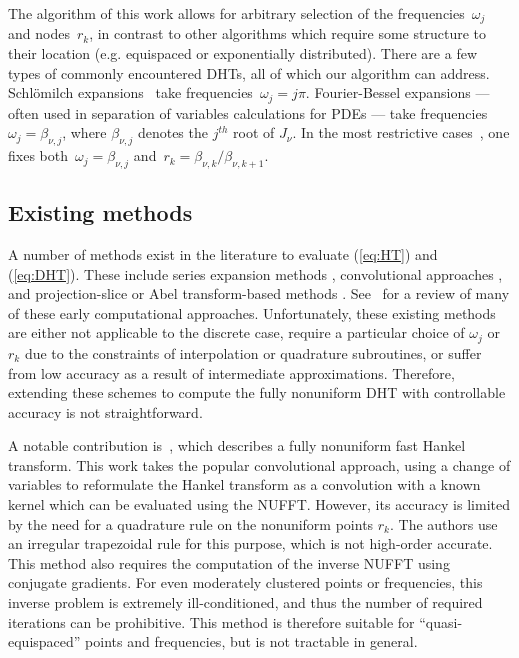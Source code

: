 The algorithm of this work allows for arbitrary selection of the
frequencies~$\omega_j$ and nodes~$r_k$, in contrast to other algorithms which
require some structure to their location (e.g. equispaced or exponentially
distributed). There are a few types of commonly encountered DHTs, all of which
our algorithm can address. Schl\"omilch
expansions~\cite{linton2006schlomilch,townsend2015fast} take
frequencies~$\omega_j = j\pi$. Fourier-Bessel expansions --- often used in
separation of variables calculations for PDEs --- take frequencies~$\omega_j =
\beta_{\nu,j}$, where $\beta_{\nu,j}$ denotes the $j^{th}$ root of $J_\nu$. In
the most restrictive cases~\cite{johnson1987improved}, one fixes both~$\omega_j
= \beta_{\nu,j}$ and~$r_k = \beta_{\nu,k}/\beta_{\nu,k+1}$.

\subsection*{Existing methods}
\label{sec:existing}

A number of methods exist in the literature to evaluate (\ref{eq:HT}) and
(\ref{eq:DHT}). These include series expansion methods
\cite{lord1954b,brunol1977fourier,cavanagh1979numerical}, convolutional
approaches \cite{siegman1977quasi, johansen1979fast, mook1983algorithm,
liu1999nonuniform}, and projection-slice or Abel transform-based methods
\cite{oppenheim1980computation, hansen1985fast, kapur1995algorithm}.
See~\cite{cree1993algorithms} for a review of many of these early computational
approaches. Unfortunately, these existing methods are either not applicable to
the discrete case, require a particular choice of $\omega_j$ or $r_k$ due to the
constraints of interpolation or quadrature subroutines, or suffer from low
accuracy as a result of intermediate approximations. Therefore, extending these
schemes to compute the fully nonuniform DHT with controllable accuracy is not
straightforward.

A notable contribution is~\cite{liu1999nonuniform}, which describes a fully
nonuniform fast Hankel transform. This work takes the popular convolutional
approach, using a change of variables to reformulate the Hankel transform as a
convolution with a known kernel which can be evaluated using the NUFFT. However,
its accuracy is limited by the need for a quadrature rule on the nonuniform
points $r_k$. The authors use an irregular trapezoidal rule for this purpose,
which is not high-order accurate. This method also requires the computation of
the inverse NUFFT using conjugate gradients. For even moderately clustered
points or frequencies, this inverse problem is extremely ill-conditioned, and
thus the number of required iterations can be prohibitive. This method is
therefore suitable for ``quasi-equispaced'' points and frequencies, but is not
tractable in general.

